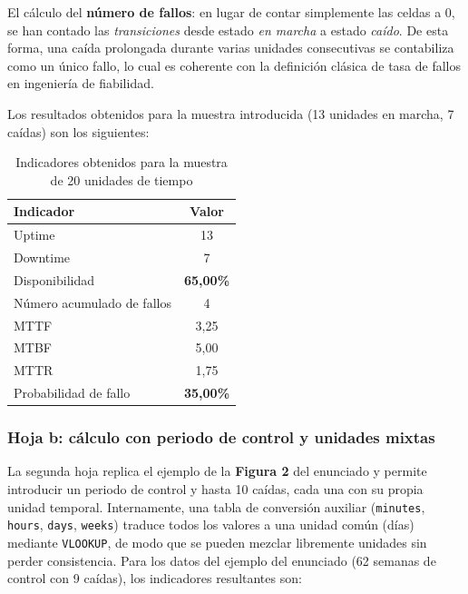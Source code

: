 \documentclass{article}
\newcommand{\good}[1]{\textbf{\textcolor{metGood}{#1}}}
\newcommand{\medium}[1]{\textbf{\textcolor{metMedium}{#1}}}
\begin{document}
El cálculo del \textbf{número de fallos}: en lugar de
contar simplemente las celdas a 0, se han contado las \textit{transiciones} desde
estado \textit{en marcha} a estado \textit{caído}. De esta forma, una caída prolongada
durante varias unidades consecutivas se contabiliza como un único fallo, lo cual es
coherente con la definición clásica de tasa de fallos en ingeniería de fiabilidad.

Los resultados obtenidos para la muestra introducida (13 unidades en marcha, 7 caídas)
son los siguientes:

\begin{table}[H]
    \centering
    \small
    \begin{tabular}{lc}
        \toprule
        \textbf{Indicador}            & \textbf{Valor}    \\
        \midrule
        Uptime                        & 13                \\
        Downtime                      & 7                 \\
        Disponibilidad                & \good{65{,}00\%}  \\
        Número acumulado de fallos    & 4                 \\
        MTTF                          & 3{,}25            \\
        MTBF                          & 5{,}00            \\
        MTTR                          & 1{,}75            \\
        Probabilidad de fallo         & \medium{35{,}00\%}\\
        \bottomrule
    \end{tabular}
    \caption{Indicadores obtenidos para la muestra de 20 unidades de tiempo}
    \label{tab:indicadores_a}
\end{table}

\subsubsection{Hoja b: cálculo con periodo de control y unidades mixtas}

La segunda hoja replica el ejemplo de la \textbf{Figura 2} del enunciado y permite
introducir un periodo de control y hasta 10 caídas, cada una con su propia unidad
temporal. Internamente, una tabla de conversión auxiliar (\texttt{minutes},
\texttt{hours}, \texttt{days}, \texttt{weeks}) traduce todos los valores a una unidad
común (días) mediante \texttt{VLOOKUP}, de modo que se pueden mezclar libremente
unidades sin perder consistencia. Para los datos del ejemplo del enunciado (62 semanas
de control con 9 caídas), los indicadores resultantes son:
\end{document}
